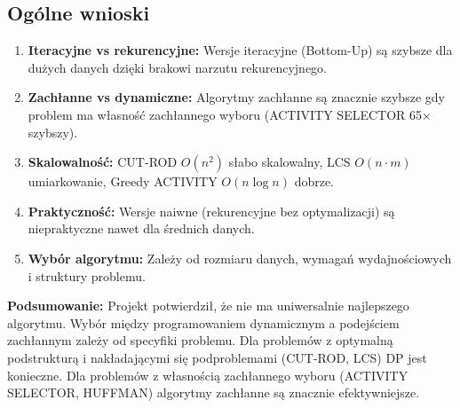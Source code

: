 \documentclass[11pt,a4paper]{article}
\begin{document}
\subsection*{Ogólne wnioski}
\begin{enumerate}[itemsep=2pt, topsep=2pt]
    \item \textbf{Iteracyjne vs rekurencyjne:} Wersje iteracyjne (Bottom-Up) są szybsze dla dużych danych dzięki brakowi narzutu rekurencyjnego.
    
    \item \textbf{Zachłanne vs dynamiczne:} Algorytmy zachłanne są znacznie szybsze gdy problem ma własność zachłannego wyboru (ACTIVITY SELECTOR 65× szybszy).
    
    \item \textbf{Skalowalność:} CUT-ROD $O(n^2)$ słabo skalowalny, LCS $O(n \cdot m)$ umiarkowanie, Greedy ACTIVITY $O(n \log n)$ dobrze.
    
    \item \textbf{Praktyczność:} Wersje naiwne (rekurencyjne bez optymalizacji) są niepraktyczne nawet dla średnich danych.
    
    \item \textbf{Wybór algorytmu:} Zależy od rozmiaru danych, wymagań wydajnościowych i struktury problemu.
\end{enumerate}

\textbf{Podsumowanie:} Projekt potwierdził, że nie ma uniwersalnie najlepszego algorytmu. Wybór między programowaniem dynamicznym a podejściem zachłannym zależy od specyfiki problemu. Dla problemów z optymalną podstrukturą i nakładającymi się podproblemami (CUT-ROD, LCS) DP jest konieczne. Dla problemów z własnością zachłannego wyboru (ACTIVITY SELECTOR, HUFFMAN) algorytmy zachłanne są znacznie efektywniejsze.
\end{document}

